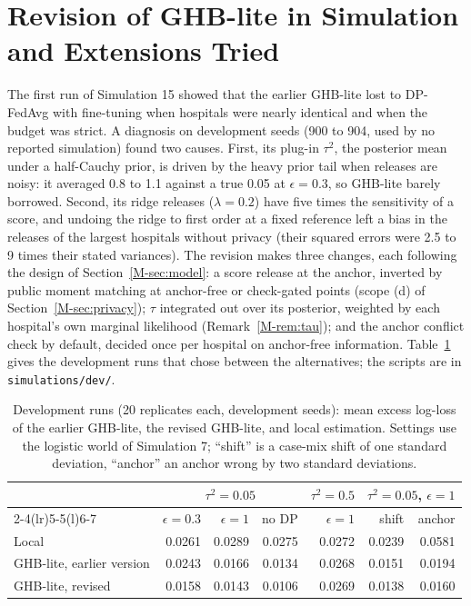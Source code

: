 \documentclass[acmsmall,screen,nonacm]{acmart}
\theoremstyle{acmdefinition}
\begin{document}
\section{Revision of GHB-lite in Simulation and Extensions Tried}\label{sec:revision}

The first run of Simulation 15 showed that the earlier GHB-lite lost to DP-FedAvg \cite{mcmahan2018learning} with fine-tuning when hospitals were nearly identical and when the budget was strict. A diagnosis on development seeds (900 to 904, used by no reported simulation) found two causes. First, its plug-in $\tau^2$, the posterior mean under a half-Cauchy prior, is driven by the heavy prior tail when releases are noisy: it averaged 0.8 to 1.1 against a true 0.05 at $\epsilon=0.3$, so GHB-lite barely borrowed. Second, its ridge releases ($\lambda=0.2$) have five times the sensitivity of a score, and undoing the ridge to first order at a fixed reference left a bias in the releases of the largest hospitals without privacy (their squared errors were 2.5 to 9 times their stated variances). The revision makes three changes, each following the design of Section~\ref{M-sec:model}: a score release at the anchor, inverted by public moment matching at anchor-free or check-gated points (scope (d) of Section~\ref{M-sec:privacy}); $\tau$ integrated out over its posterior, weighted by each hospital's own marginal likelihood (Remark~\ref{M-rem:tau}); and the anchor conflict check by default, decided once per hospital on anchor-free information. Table~\ref{tab:dev} gives the development runs that chose between the alternatives; the scripts are in \texttt{simulations/dev/}.

\begin{table}[t]
\caption{Development runs (20 replicates each, development seeds): mean excess log-loss of the earlier GHB-lite, the revised GHB-lite, and local estimation. Settings use the logistic world of Simulation 7; ``shift'' is a case-mix shift of one standard deviation, ``anchor'' an anchor wrong by two standard deviations.}
\label{tab:dev}
\footnotesize
\begin{tabular}{@{}lrrrrrr@{}}
\toprule
 & \multicolumn{3}{c}{$\tau^2=0.05$} & $\tau^2=0.5$ & \multicolumn{2}{c}{$\tau^2=0.05$, $\epsilon=1$}\\
\cmidrule(lr){2-4}\cmidrule(lr){5-5}\cmidrule(l){6-7}
 & $\epsilon=0.3$ & $\epsilon=1$ & no DP & $\epsilon=1$ & shift & anchor\\
\midrule
Local & 0.0261 & 0.0289 & 0.0275 & 0.0272 & 0.0239 & 0.0581\\
GHB-lite, earlier version & 0.0243 & 0.0166 & 0.0134 & 0.0268 & 0.0151 & 0.0194\\
GHB-lite, revised & 0.0158 & 0.0143 & 0.0106 & 0.0269 & 0.0138 & 0.0160\\
\bottomrule
\end{tabular}
\end{table}
\end{document}
